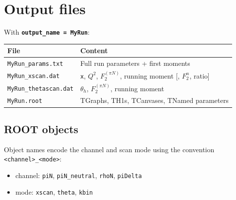 \documentclass[11pt,a4paper]{article}
\newcommand{\inikey}[1]{\texttt{\textbf{#1}}}
\begin{document}
\section{Output files}

With \inikey{output\_name = MyRun}:

\begin{center}
\begin{tabular}{ll}
\toprule
\textbf{File} & \textbf{Content} \\
\midrule
\texttt{MyRun\_params.txt}    & Full run parameters + first moments \\
\texttt{MyRun\_xscan.dat}     & \texttt{x}, $Q^2$, $F_2^{(\pi N)}$, running moment [, $F_2^n$, ratio] \\
\texttt{MyRun\_thetascan.dat} & $\theta_h$, $F_2^{(\pi N)}$, running moment \\
\texttt{MyRun.root}           & TGraphs, TH1s, TCanvases, TNamed parameters \\
\bottomrule
\end{tabular}
\end{center}

\subsection{ROOT objects}

Object names encode the channel and scan mode using the convention
\texttt{<channel>\_<mode>}:
\begin{itemize}
  \item channel: \texttt{piN}, \texttt{piN\_neutral}, \texttt{rhoN}, \texttt{piDelta}
  \item mode: \texttt{xscan}, \texttt{theta}, \texttt{kbin}
\end{itemize}
\end{document}
